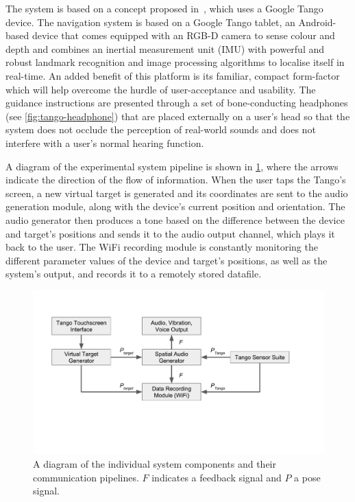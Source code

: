 \documentclass{llncs}
\begin{document}
The system is based on a concept proposed in~\cite{bellotto2013,lock2017portable}, which uses a Google Tango device.
The navigation system is based on a Google Tango tablet, an Android-based device that comes equipped with an RGB-D camera to sense colour and depth and combines an inertial measurement unit (IMU) with powerful and robust landmark recognition and image processing algorithms to localise itself in real-time.
An added benefit of this platform is its familiar, compact form-factor which will help overcome the hurdle of user-acceptance and usability.
The guidance instructions are presented through a set of bone-conducting headphones (see \cref{fig:tango-headphone}) that are placed externally on a user's head so that the system does not occlude the perception of real-world sounds and does not interfere with a user's normal hearing function.

A diagram of the experimental system pipeline is shown in \cref{fig:pipeline}, where the arrows indicate the direction of the flow of information.
When the user taps the Tango's screen, a new virtual target is generated and its coordinates are sent to the audio generation module, along with the device's current position and orientation.
The audio generator then produces a tone based on the difference between the device and target's positions and sends it to the audio output channel, which plays it back to the user.
The WiFi recording module is constantly monitoring the different parameter values of the device and target's positions, as well as the system's output, and records it to a remotely stored datafile. 

\begin{figure}
  \centering
  \includegraphics[clip=true, trim=0 120 80 50, width=1.0\columnwidth]{figures/pipeline.pdf}
  \caption{A diagram of the individual system components and their communication pipelines. $F$ indicates a feedback signal and $P$ a pose signal. }\label{fig:pipeline}
\end{figure}
\end{document}
